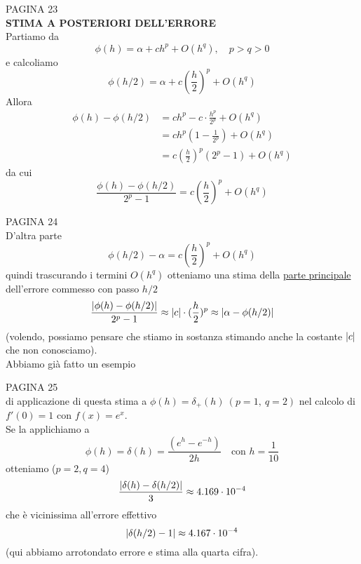 \documentclass[12pt,a4paper]{article}
\DeclarePairedDelimiter{\abs}{\lvert}{\rvert}
\begin{document}
PAGINA 23 \\ %
\textbf{STIMA A POSTERIORI DELL'ERRORE}\\
Partiamo da
\[
\phi (h) = \alpha + ch^p + O(h^q), \quad p>q>0
\]
e calcoliamo
\[
\phi (h/2) = \alpha + c(\frac{h}{2})^p + O(h^q)
\]
Allora
\[
\begin{split}
\phi (h) - \phi (h/2) & = ch^p - c \cdot \frac{h^p}{2^p} + O(h^q) \\
& = ch^p (1 - \frac{1}{2^p}) + O(h^q) \\
& = c(\frac{h}{2})^p (2^p-1) + O(h^q)
\end{split}
\]
da cui
\[
\frac{\phi (h) - \phi (h/2)}{2^p - 1} = c(\frac{h}{2})^p + O(h^q)
\]

PAGINA 24 \\ %
D'altra parte
\[
\phi (h/2) - \alpha = c(\frac{h}{2})^p + O(h^q)
\]
quindi trascurando i termini $O(h^q)$ otteniamo una stima della \underline{parte principale} dell'errore commesso con passo $h/2$
\[
\frac{\abs{\phi (h) - \phi (h/2)}}{2^p-1} \approx \abs{c} \cdot (\frac{h}{2})^p \approx \abs{\alpha - \phi (h/2)}
\]
(volendo, possiamo pensare che stiamo in sostanza stimando anche la costante $\abs{c}$ che non conosciamo).\\
Abbiamo già fatto un esempio

PAGINA 25 \\ %
di applicazione di questa stima a $\phi (h) = \delta_+ (h) \ (p=1, \ q=2)$ nel calcolo di $f'(0) = 1$ con $f(x) = e^x$.\\
Se la applichiamo a
\[
\phi (h) = \delta (h) = \frac{(e^h - e^{-h})}{2h} \quad \text{con } h=\frac{1}{10}
\]
otteniamo ($p=2, q=4$)
\[
\frac{\abs{\delta (h) - \delta (h/2)}}{3} \approx 4.169 \cdot 10^{-4}
\]
che è vicinissima all'errore effettivo
\[
\abs{\delta (h/2) - 1} \approx 4.167 \cdot 10^{-4}
\]
(qui abbiamo arrotondato errore e stima alla quarta cifra).\\
\end{document}
